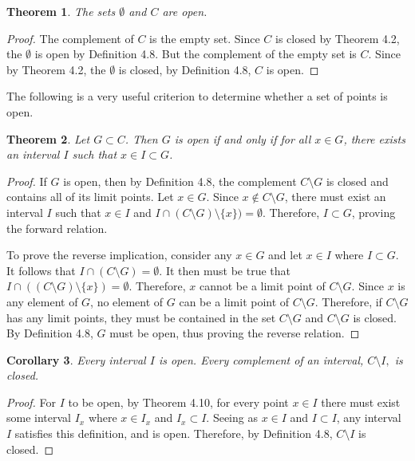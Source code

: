 \documentclass{amsart}
\newtheorem{theorem}{Theorem}
\newtheorem{corollary}[theorem]{Corollary}
\newcommand{\1}{\mathds{1}}
\numberwithin{equation}{section}
\numberwithin{theorem}{section}
\begin{document}
\begin{theorem}\label{fortop1}  The sets $\emptyset$ and $C$ are open.
\end{theorem}

\begin{proof}
	The complement of $C$ is the empty set. Since $C$ is closed by Theorem 4.2, the $\emptyset$ is open by Definition 4.8. But the complement of the empty set is $C$. Since by Theorem 4.2, the $\emptyset$ is closed, by Definition 4.8, $C$ is open. 
\end{proof}

The following is a very useful criterion to determine whether a set of points is open.

\begin{theorem}  Let $G \subset C$.  Then $G$ is open if and only if for all $x \in G$, there exists an interval $I$ such that $x \in I \subset G$.
\end{theorem}

\begin{proof}
	If $G$ is open, then by Definition 4.8, the complement $C\setminus G$ is closed and contains all of its limit points. Let $x\in G$. Since $x\notin C\setminus G$, there must exist an interval $I$ such that $x\in I$ and $I\cap (C\setminus G)\setminus \{x\}) = \emptyset$. Therefore, $I\subset G$, proving the forward relation.
	
	To prove the reverse implication, consider any $x\in G$ and let $x\in I$ where $I\subset G$. It follows that $I\cap (C\setminus G) = \emptyset$. It then must be true that $I\cap ((C\setminus G)\setminus \{x\})  = \emptyset$. Therefore, $x$ cannot be a limit point of $C\setminus G$. Since $x$ is any element of $G$, no element of $G$ can be a limit point of $C\setminus G$. Therefore, if $C\setminus G$ has any limit points, they must be contained in the set $C\setminus G$ and $C\setminus G$ is closed. By Definition 4.8, $G$ must be open, thus proving the reverse relation.
\end{proof}

\begin{corollary}  Every interval $I$ is open.  Every complement of an interval, $C \setminus I,$ is closed.
\end{corollary}

\begin{proof}
	For $I$ to be open, by Theorem 4.10, for every point $x\in I$ there must exist some interval $I_x$ where $x\in I_x$ and $I_x\subset I$. Seeing as $x\in I$ and $I\subset I$, any interval $I$ satisfies this definition, and is open. Therefore, by Definition 4.8, $C\setminus I$ is closed.
\end{proof}
\end{document}
